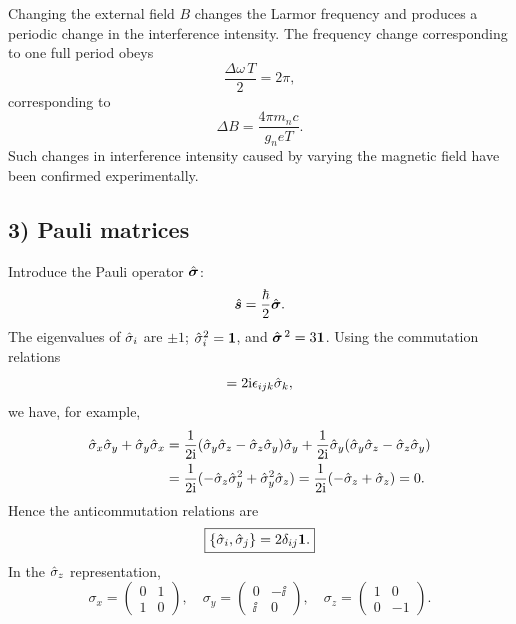 Changing the external field $B$ changes the Larmor frequency and produces a periodic change in the interference intensity. The frequency change corresponding to one full period obeys
\begin{equation}
\frac{\Delta\omega\,T}{2}=2\pi,
\end{equation}
corresponding to
\begin{equation}
\boxed{\Delta B=\frac{4\pi m_nc}{g_neT}.}
\end{equation}
Such changes in interference intensity caused by varying the magnetic field have been confirmed experimentally.

\subsection*{3) Pauli matrices}
Introduce the Pauli operator $\hat{\bm{\sigma}}$:
\begin{equation}
\hat{\bm{s}}=\frac\hbar2\hat{\bm{\sigma}}.
\end{equation}
The eigenvalues of $\hat{\sigma}_i$ are $\pm1$; $\hat{\sigma}_i^2=\mathbf1$, and $\hat{\bm{\sigma}}^{\,2}=3\mathbf1$.
Using the commutation relations
\begin{equation}
[\op\sigma_i,\op\sigma_j]=2\ii\epsilon_{ijk}\op\sigma_k,
\end{equation}
we have, for example,
\begin{equation}\begin{aligned}
\hat{\sigma}_x\hat{\sigma}_y+\hat{\sigma}_y\hat{\sigma}_x
&=\frac1{2\mathrm{i}}(\hat{\sigma}_y\hat{\sigma}_z-\hat{\sigma}_z\hat{\sigma}_y)\hat{\sigma}_y
+\frac1{2\mathrm{i}}\hat{\sigma}_y(\hat{\sigma}_y\hat{\sigma}_z-\hat{\sigma}_z\hat{\sigma}_y)\\
&=\frac1{2\mathrm{i}}(-\hat{\sigma}_z\hat{\sigma}_y^2+\hat{\sigma}_y^2\hat{\sigma}_z)
=\frac1{2\mathrm{i}}(-\hat{\sigma}_z+\hat{\sigma}_z)=0.
\end{aligned}\end{equation}
Hence the anticommutation relations are
\begin{equation}
\boxed{\{\hat{\sigma}_i,\hat{\sigma}_j\}=2\delta_{ij}\mathbf1.}
\end{equation}
In the $\hat{\sigma}_z$ representation,
\begin{equation}
\sigma_x=\begin{pmatrix}0&1\\1&0\end{pmatrix},\quad
\sigma_y=\begin{pmatrix}0&-\ii\\\ii&0\end{pmatrix},\quad
\sigma_z=\begin{pmatrix}1&0\\0&-1\end{pmatrix}.
\end{equation}
